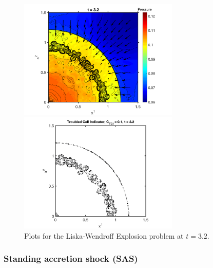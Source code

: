 \documentclass[letterpaper]{jpconf}
\begin{document}
\begin{figure}[h]
  \centering
  \begin{minipage}{18pc}
    \includegraphics[width=18pc]{./Figures/Explosion_Astronum_2018}
  \end{minipage}\hspace{0.5pc}%
  \begin{minipage}{18pc}
    \includegraphics[width=18pc]{./Figures/Explosion_TCI_Astronum_2018}
  \end{minipage}
  \caption{\label{fig:Implosion}Plots for the Liska-Wendroff Explosion problem at $t=3.2$.}
\end{figure}

\subsubsection{Standing accretion shock (SAS)}
\end{document}
